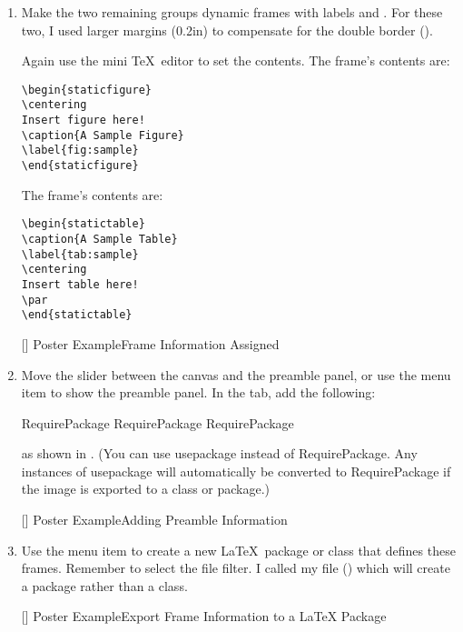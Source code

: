 \begin{enumerate}
\item  Make the two remaining groups dynamic frames
with labels  and . For these two, I used larger
margins (0.2in) to compensate for the double border
().

Again use the mini \TeX\ editor to set the contents. The 
frame's contents are:
\begin{verbatim}
\begin{staticfigure}
\centering
Insert figure here!
\caption{A Sample Figure}
\label{fig:sample}
\end{staticfigure}
\end{verbatim}
The  frame's contents are:
\begin{verbatim}
\begin{statictable}
\caption{A Sample Table}
\label{tab:sample}
\centering
Insert table here!
\par
\end{statictable}
\end{verbatim}

[]
{}
{Poster Example\dash Frame Information Assigned}

\item Move the slider between the \gls{canvas} and the preamble
panel, or use the  menu item to
show the \gls{preamble} panel. In the 
tab, add the following:
\begin{codebox}
\gls{RequirePackage}
\gls{RequirePackage}
\gls{RequirePackage}
\end{codebox}
as shown in . (You can use
\gls{usepackage} instead of \gls{RequirePackage}. Any
instances of \gls{usepackage} will automatically be converted to
\gls{RequirePackage} if the image is exported to a class or
package.)

[]
{}
{Poster Example\dash Adding Preamble Information}

\item Use the  menu item to create
a new \LaTeX\ package or class that defines these frames. Remember to
select the  file filter.
I called my file  () which
will create a package rather than a class.

[]
{}
{Poster Example\dash Export Frame Information to a \LaTeX{} Package}


\end{enumerate}
